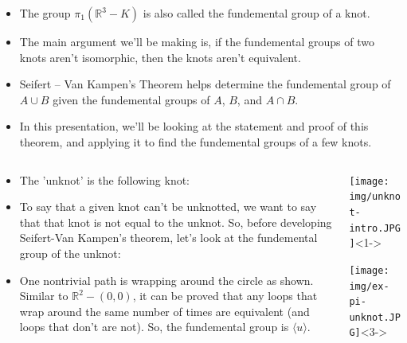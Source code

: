 \documentclass[8pt]{beamer}
\begin{document}
\begin{frame}
\begin{columns}
\begin{column}[T]{0.5\textwidth}
\begin{itemize}
          \item<5->
            The group $\pi_1(\mathbb{R}^3 - K)$ is also called the fundemental
            group of a knot.

          \item<6->
            The main argument we'll be making is, if the fundemental groups of
            two knots aren't isomorphic, then the knots aren't equivalent.

          \item<7->
            Seifert -- Van Kampen's Theorem helps determine the fundemental
            group of $A \cup B$ given the fundemental groups of $A$, $B$, and
            $A \cap B$.

          \item<8->
            In this presentation, we'll be looking at the statement and proof
            of this theorem, and applying it to find the fundemental groups of a
            few knots.
        \end{itemize}
      \end{column}
    \end{columns}
  \end{frame}
  \begin{frame}
    \begin{columns}
      \begin{column}[T]{0.5\textwidth}
        \begin{itemize}
          \item<1-> The 'unknot' is the following knot:
          \item<2-> To say that a given knot can't be unknotted, we want to say
            that that knot is not equal to the unknot. So, before developing
            Seifert-Van Kampen's theorem, let's look at the fundemental group of
            the unknot:
          \item<3-> One nontrivial path is wrapping around the circle as shown.
            Similar to $\mathbb{R}^2-(0,0)$, it can be proved that any loops
            that wrap around the same number of times are equivalent (and loops
            that don't are not). So, the fundemental group is $\langle u\rangle $.
        \end{itemize}
      \end{column}
      \begin{column}[T]{0.5\textwidth}
        \begin{center}
          \texttt{[image: img/unknot-intro.JPG]}<1->
        \end{center}
        \begin{center}
          \texttt{[image: img/ex-pi-unknot.JPG]}<3->
        \end{center}
      \end{column}
    \end{columns}
  \end{frame}
\end{document}
